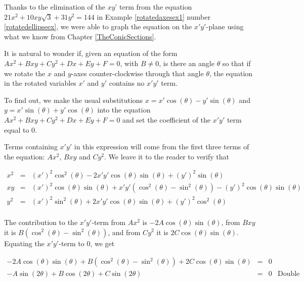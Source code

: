 Thanks to the elimination of  the $xy$' term from the equation $21x^2+10xy\sqrt{3}+31y^2=144$ in  Example \ref{rotatedaxesex1} number \ref{rotatedellipseex}, we   were able to graph the equation on the $x'y'$-plane using what we know from Chapter \ref{TheConicSections}. 

\smallskip
	
 It is natural to wonder if, given an equation of the form $Ax^2 + Bxy +Cy^2 + Dx + Ey + F = 0$, with $B \neq 0$, is there an angle $\theta$ so that if we rotate the $x$ and $y$-axes counter-clockwise through that angle $\theta$, the equation in the rotated  variables $x'$ and $y'$ contains no $x'y'$ term.
 
 \smallskip
 
  To find out, we make the usual substitutions  $x = x' \cos(\theta) - y' \sin(\theta)$ and  $y =  x'\sin(\theta) + y'\cos(\theta)$ into the equation $Ax^2 + Bxy +Cy^2 + Dx + Ey + F = 0$ and set the coefficient of the $x'y'$ term equal to $0$.  
  
  \smallskip
  
  Terms containing $x'y'$ in this expression will come from the first three terms of the equation: $Ax^2$, $Bxy$ and $Cy^2$.  We leave it to the reader to verify that 

\[ \begin{array}{rcl}



x^2 & = &(x')^2 \cos^{2}(\theta) - 2x'y'\cos(\theta) \sin(\theta) + (y')^2 \sin(\theta) \\ [3pt]


xy & = &  (x')^2\cos(\theta) \sin(\theta)+ x'y' \left(\cos^{2}(\theta)-\sin^2(\theta)\right)-(y')^2\cos(\theta)\sin(\theta) \\ [3pt]


y^2 & = & (x')^2 \sin^{2}(\theta) +2x'y' \cos(\theta) \sin(\theta) +(y')^2 \cos^{2}(\theta) \\

\end{array} \]

The contribution to the $x'y'$-term from $Ax^2$ is $-2A\cos(\theta) \sin(\theta)$, from $Bxy$ it is $B \left(\cos^{2}(\theta)-\sin^2(\theta)\right)$, and from $Cy^2$ it is $2C \cos(\theta) \sin(\theta)$.  Equating the $x'y'$-term to $0$, we get

\[ \begin{array}{rcll}

-2A\cos(\theta) \sin(\theta) + B \left(\cos^{2}(\theta)-\sin^2(\theta)\right) + 2C \cos(\theta) \sin(\theta) & = & 0 & \\ [3pt]
-A \sin(2\theta) + B \cos(2\theta) + C \sin(2\theta) & = & 0 & \text{Double Angle Identities} \\ [3pt]
\end{array} \]

